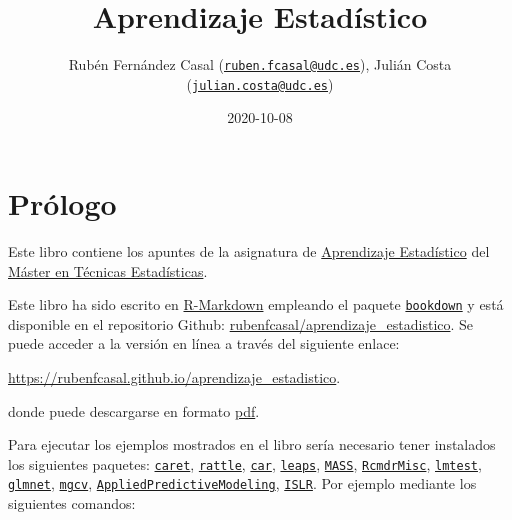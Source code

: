 \documentclass[]{book}
\title{Aprendizaje Estadístico}
\author{Rubén Fernández Casal
(\href{mailto:ruben.fcasal@udc.es}{\nolinkurl{ruben.fcasal@udc.es}}),
Julián Costa
(\href{mailto:julian.costa@udc.es}{\nolinkurl{julian.costa@udc.es}})}
\date{2020-10-08}
\theoremstyle{break}
\theoremstyle{definition}
\theoremstyle{definition}
\theoremstyle{definition}
\theoremstyle{remark}
\begin{document}
\maketitle

{
\setcounter{tocdepth}{1}
\tableofcontents
}
\chapter*{Prólogo}\label{pruxf3logo}

Este libro contiene los apuntes de la asignatura de
\href{http://eamo.usc.es/pub/mte/index.php?option=com_content\&view=article\&id=74}{Aprendizaje
Estadístico} del \href{http://eio.usc.es/pub/mte}{Máster en Técnicas
Estadísticas}.

Este libro ha sido escrito en
\href{http://rmarkdown.rstudio.com}{R-Markdown} empleando el paquete
\href{https://bookdown.org/yihui/bookdown/}{\texttt{bookdown}} y está
disponible en el repositorio Github:
\href{https://github.com/rubenfcasal/aprendizaje_estadistico}{rubenfcasal/aprendizaje\_estadistico}.
Se puede acceder a la versión en línea a través del siguiente enlace:

\url{https://rubenfcasal.github.io/aprendizaje_estadistico}.

donde puede descargarse en formato
\href{https://rubenfcasal.github.io/aprendizaje_estadistico/aprendizaje_estadistico.pdf}{pdf}.

Para ejecutar los ejemplos mostrados en el libro sería necesario tener
instalados los siguientes paquetes:
\href{https://CRAN.R-project.org/package=caret}{\texttt{caret}},
\href{https://CRAN.R-project.org/package=rattle}{\texttt{rattle}},
\href{https://CRAN.R-project.org/package=car}{\texttt{car}},
\href{https://CRAN.R-project.org/package=leaps}{\texttt{leaps}},
\href{https://CRAN.R-project.org/package=MASS}{\texttt{MASS}},
\href{https://CRAN.R-project.org/package=RcmdrMisc}{\texttt{RcmdrMisc}},
\href{https://CRAN.R-project.org/package=lmtest}{\texttt{lmtest}},
\href{https://CRAN.R-project.org/package=glmnet}{\texttt{glmnet}},
\href{https://CRAN.R-project.org/package=mgcv}{\texttt{mgcv}},
\href{https://CRAN.R-project.org/package=AppliedPredictiveModeling}{\texttt{AppliedPredictiveModeling}},
\href{https://CRAN.R-project.org/package=ISLR}{\texttt{ISLR}}. Por
ejemplo mediante los siguientes comandos:
\end{document}
